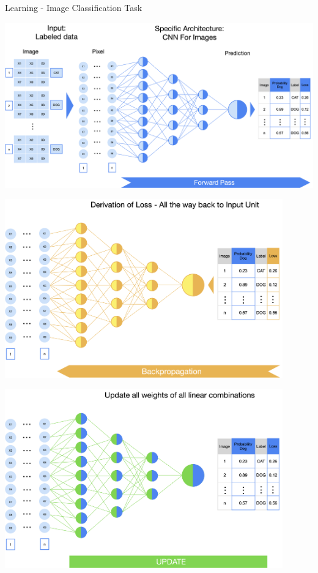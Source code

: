 \documentclass[11pt,compress,t,notes=noshow, xcolor=table]{beamer}
\begin{document}
\begin{vbframe}{Learning - Image Classification Task}
\vspace{0.5cm}
\begin{center}
   \includegraphics[width = \textwidth]{slides/neural-networks/figure_man/nutshell-nn-learning-forward-pass.png}    
\end{center}
 
\end{vbframe}

\begin{vbframe}
\vspace{0.5cm}
\begin{center}
   \includegraphics[width = 0.9\textwidth]{slides/neural-networks/figure_man/nutshell-nn-learning-backpropagation.png}    
\end{center}    
\end{vbframe}

\begin{vbframe}
\vspace{0.5cm}
\begin{center}
   \includegraphics[width = 0.9\textwidth]{slides/neural-networks/figure_man/nutshell-nn-learning-update.png}    
\end{center}    
\end{vbframe}

\endlecture
\end{document}

